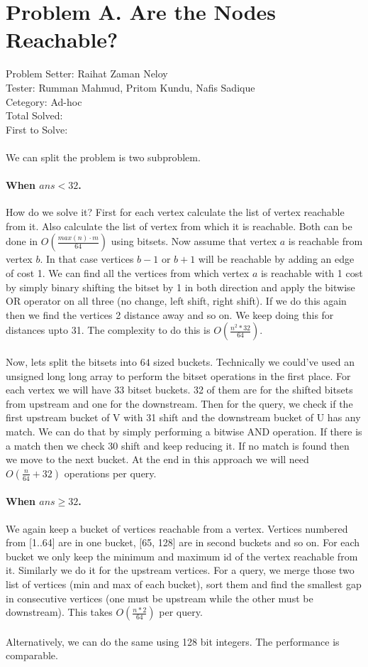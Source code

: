 \section*{Problem A. Are the Nodes Reachable?}
Problem Setter: Raihat Zaman Neloy\\
Tester: Rumman Mahmud, Pritom Kundu, Nafis Sadique\\
Cetegory: Ad-hoc\\
Total Solved: \\
First to Solve: \\
\\
We can split the problem is two subproblem.
\paragraph*{When $ans < 32$.}
How do we solve it? First for each vertex calculate the list of vertex reachable from it. Also
calculate the list of vertex from which it is reachable. Both can be done in $O(\frac{max(n) \cdot m}{64})$ using bitsets.
Now assume that vertex $a$ is reachable from vertex $b$. In that case vertices $b-1$ or $b+1$ will be reachable by 
adding an edge of cost 1. We can find all the vertices from which vertex $a$ is reachable with 1 cost by simply
binary shifting the bitset by 1 in both direction and apply the bitwise OR operator on all three (no change, left shift, right shift).
If we do this again then we find the vertices 2 distance away and so on. We keep doing this for distances upto 31. The
complexity to do this is $O(\frac{n^2*32}{64})$. 
\\
\\
Now, lets split the bitsets into $64$ sized buckets. Technically we could've used an unsigned long long array to perform
the bitset operations in the first place. For each vertex we will have 33 bitset buckets. 32 of them are for
the shifted bitsets from upstream and one for the downstream.
Then for the query, we check if the first upstream bucket of V with 31 shift and the downstream bucket of U has any match. We 
can do that by simply performing a bitwise AND operation. If there is a match then we check 30 shift and keep reducing it. If 
no match is found then we move to the next bucket. At the end in this approach we will need $O(\frac{n}{64}+32)$ operations
per query.
\paragraph*{When $ans \ge 32$.}
We again keep a bucket of vertices reachable from a vertex. Vertices numbered from [1..64] are in one bucket, [65, 128] are 
in second buckets and so on. For each bucket we only keep the minimum and maximum id of the vertex reachable from it. Similarly we do it 
for the upstream vertices. For a query, we merge those two list of vertices (min and max of each bucket), sort them and find the
smallest gap in consecutive vertices (one must be upstream while the other must be downstream). This takes $O(\frac{n*2}{64})$ per
query.
\\ 
\\
Alternatively, we can do the same using 128 bit integers. The performance is comparable.
